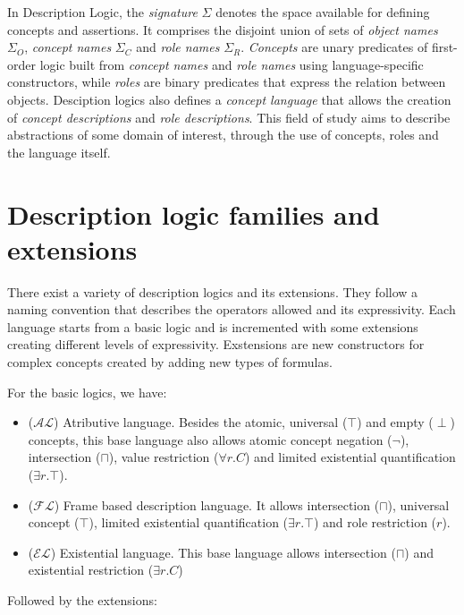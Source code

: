 In Description Logic, the \textit{signature} $\Sigma$ denotes the space available for defining concepts and assertions. It comprises the disjoint union of sets of \textit{object names} $\Sigma_{O}$, \textit{concept names} $\Sigma_{C}$ and \textit{role names} $\Sigma_{R}$. \textit{Concepts} are unary predicates of first-order logic built from \textit{concept names} and \textit{role names} using language-specific constructors, while \textit{roles} are binary predicates that express the relation between objects. Desciption logics also defines a \textit{concept language} that allows the creation of \textit{concept descriptions} and \textit{role descriptions}. This field of study aims to describe abstractions of some domain of interest, through the use of concepts, roles and the language itself.

\section{Description logic families and extensions}

There exist a variety of description logics and its extensions. They follow a naming convention that describes the operators allowed and its expressivity. Each language starts from a basic logic and is incremented with some extensions creating different levels of expressivity. Exstensions are new constructors for complex concepts created by adding new types of formulas.

For the basic logics, we have:

\begin{itemize}
    \item[] ($\mathcal{AL}$) Atributive language. Besides the atomic, universal ($\top$) and empty ($\perp$) concepts, this base language also allows atomic concept negation ($\neg$), intersection ($\sqcap$), value restriction ($\forall r.C$) and limited existential quantification ($\exists r.\top$).
    \item[] ($\mathcal{FL}$) Frame based description language. It allows intersection ($\sqcap$), universal concept ($\top$), limited existential quantification ($\exists r.\top$) and role restriction ($r$).
    \item[] ($\mathcal{EL}$) Existential language. This base language allows intersection ($\sqcap$) and existential restriction ($\exists r.C$)
\end{itemize}

Followed by the extensions:

